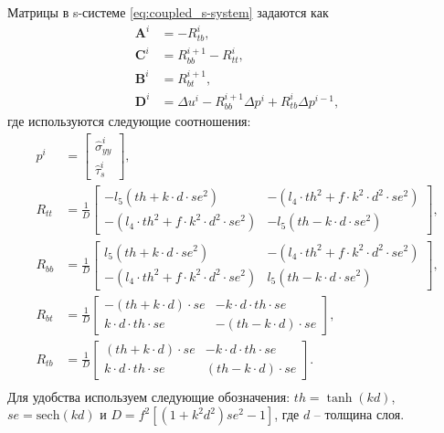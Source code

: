 Матрицы в s-системе \eqref{eq:coupled_s-system} задаются как
\begin{equation}
    \label{eq:coefficients_s-system}
    \begin{split}
        \textbf{A}^{i} & = -R^{i}_{tb},\\
        \textbf{C}^{i} & = R^{i+1}_{bb}-R^{i}_{tt},\\
        \textbf{B}^{i} & = R^{i+1}_{bt},\\
        \textbf{D}^{i} & = \Delta u^{i}-R^{i+1}_{bb}\Delta p^{i}+R^{i}_{tb}\Delta p^{i-1},
    \end{split}
\end{equation}
где используются следующие соотношения:
\begin{equation}
    \label{eq:R_matrix}
    \begin{split}
        p^i & = \left[\begin{array}{c}
            \hat{\sigma}_{yy}^{i} \\
            \hat{\tau}_s^{i}
        \end{array}\right],\\
        R_{tt} & = \frac{1}{D} \left[\begin{array}{cc}
            - l_{5}(th + k \cdot d \cdot se^{2}) & - (l_{4}\cdot th^{2} + f\cdot k^{2} \cdot d^{2} \cdot se^{2})\\
            - (l_{4}\cdot th^{2} + f\cdot k^{2} \cdot d^{2} \cdot se^{2})  & - l_{5}(th - k \cdot d \cdot se^{2}) 
        \end{array}\right],\\
        R_{bb} & = \frac{1}{D} \left[\begin{array}{cc}
            l_{5}(th + k \cdot d \cdot se^{2}) & - (l_{4}\cdot th^{2} + f\cdot k^{2} \cdot d^{2} \cdot se^{2}) \\
            - (l_{4}\cdot th^{2} + f\cdot k^{2} \cdot d^{2} \cdot se^{2})  & l_{5}(th - k \cdot d \cdot se^{2})
        \end{array}\right],\\
        R_{bt} & = \frac{1}{D} \left[\begin{array}{cc}
            - (th + k \cdot d)\cdot se & - k \cdot d \cdot th \cdot se \\
            k \cdot d \cdot th \cdot se & - (th - k \cdot d)\cdot se 
        \end{array}\right],\\
        R_{tb} & = \frac{1}{D} \left[\begin{array}{cc}
            (th + k \cdot d)\cdot se & - k \cdot d \cdot th \cdot se \\
            k \cdot d \cdot th \cdot se & (th - k \cdot d)\cdot se  
        \end{array}\right].\\
    \end{split}
\end{equation}
Для удобства используем следующие обозначения: $th = \tanh(kd)$, $se = \text{sech}(kd)$ и $D = f^{2}[(1 \!+\! k^{2} d^{2}) se^{2} \!-\! 1]$, где $d$ -- толщина слоя.


